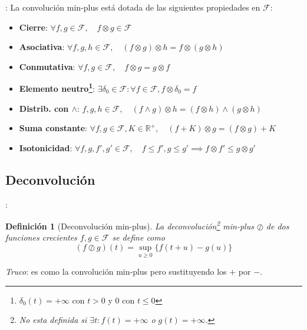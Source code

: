 \documentclass[xcolor={x11names}]{beamer}
\newtheorem{definicion}{Definición}[section]
\begin{document}
\begin{frame}{\secname: \subsecname}
    La convolución min-plus
    está dotada de las
    siguientes
    propiedades en $\mathcal{F}$:
    \begin{itemize}
        \item \textbf{Cierre}:
            $\forall f,g\in\mathcal{F},\quad f\otimes g\in\mathcal{F}$
        \pause
        \item \textbf{Asociativa}:
            $\forall f,g,h\in\mathcal{F},
            \quad 
            (f\otimes g)
            \otimes h
            =
            f\otimes
            (g\otimes h)$
        \pause
        \item \textbf{Conmutativa}:
            $\forall
            f,g\in\mathcal{F},
            \quad
            f\otimes g=
            g\otimes f$
        \pause
    \item \textbf{Elemento neutro\footnote{$\delta_0(t)=+\infty$ con $t>0$ y 0 con $t\leq0$}}:
            $\exists\delta_0\in\mathcal{F}: \forall f\in\mathcal{F},
            f\otimes\delta_0=f$
        \pause
    \item \textbf{Distrib. con $\land$}:
        $f,g,h\in\mathcal{F},
        \quad
        (f\land g)\otimes h
        = 
        (f\otimes h)
        \land
        (g\otimes h)$
    \pause
    \item \textbf{Suma constante}:
        $\forall f,g\in\mathcal{F},K\in\mathbb{R}^+,
        \quad
        (f+K)\otimes g
        =(f\otimes g) + K$

    \pause
    \item \textbf{Isotonicidad}:
        $\forall f,g,f',g'\in\mathcal{F},\quad
        f\leq f',g\leq g'
        \implies
        f\otimes f'
        \leq
        g\otimes g'$
    \end{itemize}
\end{frame}


\subsection{Deconvolución}
\begin{frame}{\secname: \subsecname}
    \begin{definicion}[Deconvolución min-plus]
        La deconvolución\footnote{No
        esta definida si
        $\exists t: f(t)=+\infty
        $ o $g(t)=+\infty$.}
        min-plus
        $\oslash$ de dos
        funciones crecientes
        $f,g\in\mathcal{F}$
        se define como
        \begin{equation}
            (f\oslash g)(t)
            =\sup_{u\geq0}
            \{f(t+u)-g(u)\}
        \end{equation}
    \end{definicion}

    \vfill

    \emph{Truco}:
    es como la convolución
    min-plus pero sustituyendo
    los $+$ por $-$.
\end{frame}
\end{document}
